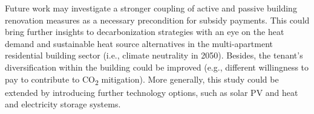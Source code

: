 Future work may investigate a stronger coupling of active and passive building renovation measures as a necessary precondition for subsidy payments. This could bring further insights to decarbonization strategies with an eye on the heat demand and sustainable heat source alternatives in the multi-apartment residential building sector (i.e., climate neutrality in 2050). Besides, the tenant's diversification within the building could be improved (e.g., different willingness to pay to contribute to CO\textsubscript{2} mitigation). More generally, this study could be extended by introducing further technology options, such as solar PV and heat and electricity storage systems. 